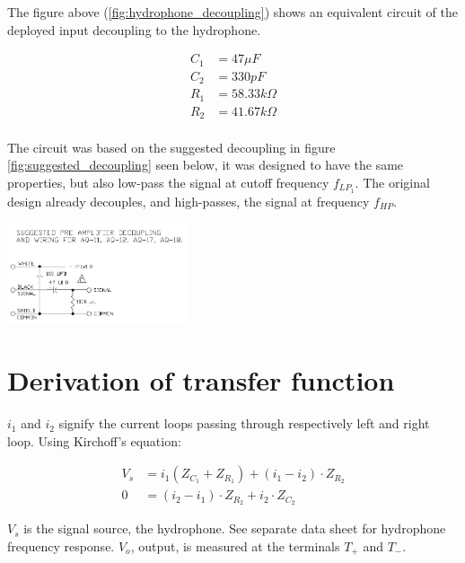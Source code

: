 \documentclass[a4paper]{article}
\begin{document}
\begin{multicols}{2}
The figure above (\ref{fig:hydrophone_decoupling}) shows an equivalent
circuit of the deployed input decoupling to the hydrophone.


\begin{align*}
  C_1 &= 47 \mu F \\
  C_2 &= 330 pF \\
  R_1 &= 58.33 k \Omega \\
  R_2 &= 41.67 k \Omega
\end{align*}

\paragraph{}The circuit was based on the suggested decoupling in figure
\ref{fig:suggested_decoupling} seen below, it was designed to have the
same properties, but also low-pass the signal at cutoff frequency
$f_{LP_1}$. The original design already decouples, and high-passes, the
signal at frequency $f_{HP}$.

  \begin{center}
    \includegraphics[width=200px]{aq-18/AQ-18-decoupling-and-wiring.jpg}
  \end{center}
  \label{fig:suggested_decoupling}

\section{Derivation of transfer function}

$i_1$ and $i_2$ signify the current loops passing through respectively left
and right loop. Using Kirchoff's equation:

\begin{align}
  \label{eqn:currents_1}
  V_s &= i_1 (Z_{C_1} + Z_{R_1}) + (i_1 - i_2) \cdot Z_{R_2} \\
  0   &= (i_2 - i_1) \cdot Z_{R_2} + i_2 \cdot Z_{C_2}
  \label{eqn:currents_2}
\end{align}

$V_s$ is the signal source, the hydrophone. See separate data sheet for
hydrophone frequency response. $V_o$, output, is measured at the
terminals $T_+$ and $T_-$.


\end{multicols}
\end{document}

